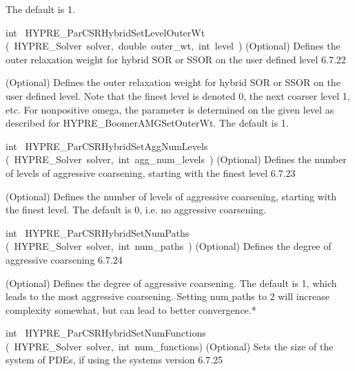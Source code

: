 \documentclass{article}
\begin{document}
\begin{cxxentry}
\begin{cxxentry}
\begin{cxxfunction}
\begin{cxxdoc}
The default is 1.
\end{cxxdoc}
\end{cxxfunction}
\begin{cxxfunction}
{int\ }
        {HYPRE\_ParCSRHybridSetLevelOuterWt}
        {(\ HYPRE\_Solver\ solver,\ double\ outer\_wt,\ int\ level\ )}
        {
(Optional) Defines the outer relaxation weight for hybrid SOR or SSOR
on the user defined level}
        {6.7.22}
\begin{cxxdoc}

(Optional) Defines the outer relaxation weight for hybrid SOR or SSOR
on the user defined level. Note that the finest level is denoted 0, the
next coarser level 1, etc. For nonpositive omega, the parameter is
determined on the given level as described for HYPRE\_BoomerAMGSetOuterWt.
The default is 1.
\end{cxxdoc}
\end{cxxfunction}
\begin{cxxfunction}
{int\ }
        {HYPRE\_ParCSRHybridSetAggNumLevels}
        {(\ HYPRE\_Solver\ solver,\ int\ agg\_num\_levels\ )}
        {
(Optional) Defines the number of levels of aggressive coarsening,
starting with the finest level}
        {6.7.23}
\begin{cxxdoc}

(Optional) Defines the number of levels of aggressive coarsening,
starting with the finest level.
The default is 0, i.e. no aggressive coarsening.
\end{cxxdoc}
\end{cxxfunction}
\begin{cxxfunction}
{int\ }
        {HYPRE\_ParCSRHybridSetNumPaths}
        {(\ HYPRE\_Solver\ solver,\ int\ num\_paths\ )}
        {
(Optional) Defines the degree of aggressive coarsening}
        {6.7.24}
\begin{cxxdoc}

(Optional) Defines the degree of aggressive coarsening.
The default is 1, which leads to the most aggressive coarsening.
Setting num$\_$paths to 2 will increase complexity somewhat,
but can lead to better convergence.*
\end{cxxdoc}
\end{cxxfunction}
\begin{cxxfunction}
{int\ }
        {HYPRE\_ParCSRHybridSetNumFunctions}
        {(\ HYPRE\_Solver\ solver,\ int\ num\_functions)}
        {
(Optional) Sets the size of the system of PDEs, if using the systems version}
        {6.7.25}
\begin{cxxdoc}


\end{cxxdoc}
\end{cxxfunction}
\end{cxxentry}
\end{cxxentry}
\end{document}
